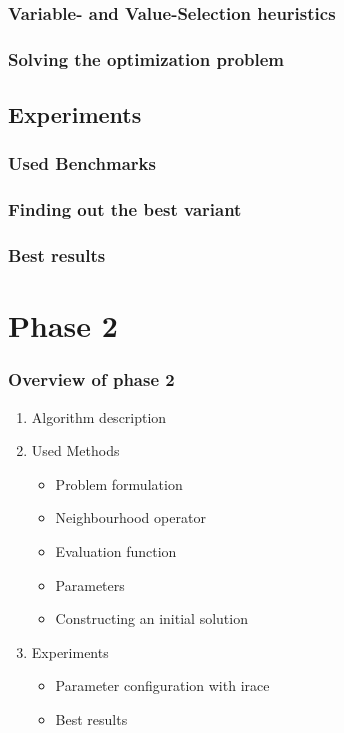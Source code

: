\documentclass{beamer}
\begin{document}
\begin{frame}
    \frametitle{Variable- and Value-Selection heuristics}


  \end{frame}

\begin{frame}
    \frametitle{Solving the optimization problem}


  \end{frame}
\subsection{Experiments}
\begin{frame}
    \frametitle{Used Benchmarks}


  \end{frame}


\begin{frame}
    \frametitle{Finding out the best variant}


\end{frame}

\begin{frame}
    \frametitle{Best results}


  \end{frame}



\section{Phase 2}
  \begin{frame}
    \frametitle{Overview of phase 2}
    \begin{enumerate}

        \item Algorithm description
        \item Used Methods
          \begin{itemize}
            \item Problem formulation
            \item Neighbourhood operator
            \item Evaluation function
            \item Parameters
            \item Constructing an initial solution
          \end{itemize}
        \item Experiments
          \begin{itemize}
          \item Parameter configuration with irace
          \item Best results
          \end{itemize}


    \end{enumerate}
  \end{frame}
\end{document}
